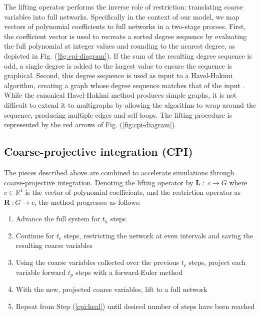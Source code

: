\documentclass[epjST, final]{svjour}
\begin{document}
\begin{onehalfspace}
The lifting operator performs the inverse role of restriction: translating coarse variables into full networks. Specifically in the context of our model, we map vectors of polynomial coefficients to full networks in a two-stage process. First, the coefficient vector is used to recreate a sorted degree sequence by evaluating the full polynomial at integer values and rounding to the nearest degree, as depicted in Fig. (\ref{fig:cpi-diagram}). If the sum of the resulting degree sequence is odd, a single degree is added to the largest value to ensure the sequence is graphical. Second, this degree sequence is used as input to a Havel-Hakimi algorithm, creating a graph whose degree sequence matches that of the input \cite{havel_remark_1955,hakimi_realizability_1962}. While the canonical Havel-Hakimi method produces simple graphs, it is not difficult to extend it to multigraphs by allowing the algorithm to wrap around the sequence, producing multiple edges and self-loops. The lifting procedure is represented by the red arrows of Fig. (\ref{fig:cpi-diagram}).

\subsection{Coarse-projective integration (CPI)}
\label{sec:cpi}

The pieces described above are combined to accelerate simulations through coarse-projective integration. Denoting the lifting operator by $\mathbf{L} \; : \; c \rightarrow G$ where $c \in \mathbb{R}^4$ is the vector of polynomial coefficients, and the restriction operator as $\mathbf{R} \; : G \rightarrow c$, the method progresses as follows:

\begin{enumerate}
\item Advance the full system for $t_h$ steps
\label{cpi:heal}
\item Continue for $t_c$ steps, restricting the network at even intervals and saving the resulting coarse variables
\item Using the coarse variables collected over the previous $t_c$ steps, project each variable forward $t_p$ steps with a forward-Euler method
\label{cpi:proj}
\item With the new, projected coarse variables, lift to a full network
\label{cpi:init}
\item Repeat from Step (\ref{cpi:heal}) until desired number of steps have been reached
\end{enumerate}


\end{onehalfspace}
\end{document}
